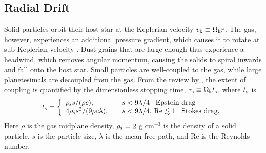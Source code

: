 \documentclass[apj]{emulateapj}
\begin{document}




\subsection{Radial Drift}
\label{sec:drift}

Solid particles orbit their host star at the Keplerian velocity $v_{\rm k} \equiv \Omega_{\rm k} r$. The gas, however, experiences an additional pressure gradient, which causes it to rotate at sub-Keplerian velocity \citep{weidenschilling77}. Dust grains that are large enough thus experience a headwind, which removes angular momentum, causing the solids to spiral inwards and fall onto the host star. Small particles are well-coupled to the gas, while large planetesimals are decoupled from the gas. From the review by \citet{chiang10}, the extent of coupling is quantified by the dimensionless stopping time, $\tau_{\rm s} \equiv \Omega_{\rm k} t_{\rm s}$, where $t_{\rm s}$ is
\begin{equation}
\label{eq:ts}
t_{\rm s}= \left\{
\begin{array}{l l}
\rho_{\rm s} s / (\rho c), & \quad s < 9 \lambda/4 \,\,\,\ \text{Epstein drag} \\
4 \rho_{\rm s} s^2 / (9 \rho c \lambda), & \quad s < 9 \lambda/4, \,\text{Re} \lesssim 1 \,\,\,\ \text{Stokes drag.}
\end{array} 
\right.
\end{equation}
Here $\rho$ is the gas midplane density, $\rho_{\rm s}=2$ g cm$^{-3}$ is the density of a solid particle, $s$ is the particle size, $\lambda$ is the mean free path, and Re is the Reynolds number. 
\end{document}
